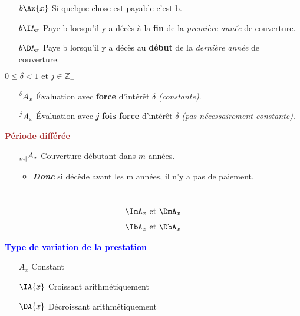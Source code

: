 \documentclass[10pt, french]{article}
\begin{document}
\begin{multicols*}{3}
\textbf{{}}
\begin{itemize}[leftmargin = .75cm]
	\item[$b \Ax{x}$] Si quelque chose est payable c'est b.
	\item[$b \IA_x$] Paye b lorsqu'il y a décès à la \textbf{fin} de la \textit{première année} de couverture.
	\item[$b \DA_x$] Paye b lorsqu'il y a décès au \textbf{début} de la \textit{dernière année} de couverture.
\end{itemize}

\textbf{{}}

$0 \leq \delta < 1 \text{ et } j \in \mathbb{Z}_+$
\begin{itemize}[leftmargin = .75cm]
	\item[$\prescript{\delta}{}{A}_x$] Évaluation avec \textbf{force} d'intérêt $\delta$ \textit{(constante)}.
	\item[$\prescript{j}{}{A}_x$] Évaluation avec \textbf{\textit{j} fois force} d'intérêt $\delta$ \textit{(pas nécessairement constante)}.
\end{itemize}

\textbf{\textcolor{brown}{Période différée}}
\begin{itemize}[leftmargin = .75cm]
	\item[$\prescript{}{m|}A_{x}$] Couverture débutant dans $m$ années.
		\begin{itemize}
		\item	\textbf{\textit{Donc}} si décède avant les m années, il n'y a pas de paiement.
		\end{itemize}
\end{itemize}

\textbf{{\color{violet}{Fréquence de variation}}} \\
{\color{violet}{variation m fois par année}}
\begin{align*}
	\ImA_{x} \text{ et } \DmA_{x} 
\end{align*}
{}
\begin{align*}
	\IbA_x \text{ et } \DbA_x 
\end{align*}

\textbf{\textcolor{blue}{Type de variation de la prestation}}
\begin{itemize}[leftmargin = .75cm]
	\item[$A_{x}$] Constant
	\item[$\IA{x}$] Croissant arithmétiquement
	\item[$\DA{x}$] Décroissant arithmétiquement
\end{itemize}


\end{multicols*}
\end{document}
